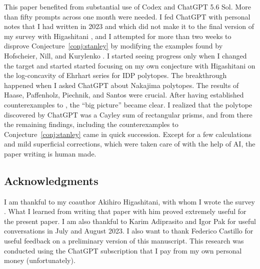 \documentclass[11pt, letterpaper, english]{amsart}
\theoremstyle{teoremas}
\theoremstyle{definition}
\begin{document}
This paper benefited from substantial use of Codex and ChatGPT 5.6 Sol. More than fifty prompts across one month were needed. I fed ChatGPT with personal notes that I had written in 2023 and which did not make it to the final version of my survey with Higashitani \cite{ferroni-higashitani}, and I attempted for more than two weeks to disprove Conjecture~\ref{conj:stanley} by modifying the examples found by Hofscheier, Nill, and Kurylenko \cite{hofscheier-kurylenko-nill1,hofscheier-kurylenko-nill2}. I started seeing progress only when I changed the target and started started focusing on my own conjecture with Higashitani on the log-concavity of Ehrhart series for IDP polytopes. The breakthrough happened when I asked ChatGPT about Nakajima polytopes. The results of Haase, Paffenholz, Piechnik, and Santos \cite{haase-paffenholz-piechnik-santos} were crucial. After having established counterexamples to \cite[Conjecture~1.2]{ferroni-higashitani}, the ``big picture'' became clear. I realized that the polytope discovered by ChatGPT was a Cayley sum of rectangular prisms, and from there the remaining findings, including the counterexamples to Conjecture~\ref{conj:stanley} came in quick succession. Except for a few calculations and mild superficial corrections, which were taken care of with the help of AI, the paper writing is human made. 

\subsection*{Acknowledgments}

I am thankful to my coauthor Akihiro Higashitani, with whom I wrote the survey \cite{ferroni-higashitani}. What I learned from writing that paper with him proved extremely useful for the present paper. I am also thankful to Karim Adiprasito and Igor Pak for useful conversations in July and August 2023. I also want to thank Federico Castillo for useful feedback on a preliminary version of this manuscript.
This research was conducted using the ChatGPT subscription that I pay from my own personal money (unfortunately).



\end{document}
